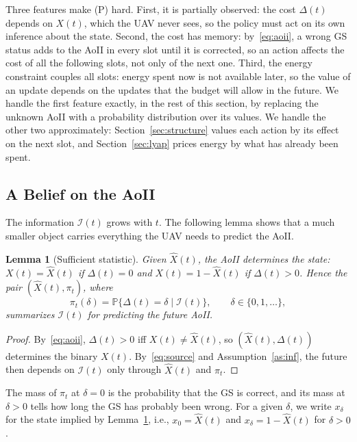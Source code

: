 \documentclass[journal]{IEEEtran}
\newtheorem{lemma}{Lemma}
\theoremstyle{remark}
\newcommand{\Prob}{\mathbb{P}}
\newcommand{\I}{\mathcal{I}}
\begin{document}
Three features make (P) hard. First, it is partially observed: the cost $\Delta(t)$ depends on $X(t)$, which the UAV never sees, so the policy must act on its own inference about the state. Second, the cost has memory: by~\eqref{eq:aoii}, a wrong GS status adds to the AoII in every slot until it is corrected, so an action affects the cost of all the following slots, not only of the next one. Third, the energy constraint couples all slots: energy spent now is not available later, so the value of an update depends on the updates that the budget will allow in the future. We handle the first feature exactly, in the rest of this section, by replacing the unknown AoII with a probability distribution over its values. We handle the other two approximately: Section~\ref{sec:structure} values each action by its effect on the next slot, and Section~\ref{sec:lyap} prices energy by what has already been spent.

\subsection{A Belief on the AoII}\label{sec:belief}
The information $\I(t)$ grows with $t$. The following lemma shows that a much smaller object carries everything the UAV needs to predict the AoII.

\begin{lemma}[Sufficient statistic]\label{lem:suff}
Given $\hat X(t)$, the AoII determines the state: $X(t)=\hat X(t)$ if $\Delta(t)=0$ and $X(t)=1-\hat X(t)$ if $\Delta(t)>0$. Hence the pair $(\hat X(t),\pi_t)$, where
\begin{equation}\label{eq:belief}
\pi_t(\delta)=\Prob\big\{\Delta(t)=\delta\mid\I(t)\big\},\qquad\delta\in\{0,1,\dots\},
\end{equation}
summarizes $\I(t)$ for predicting the future AoII.
\end{lemma}
\begin{proof}
By~\eqref{eq:aoii}, $\Delta(t)>0$ iff $X(t)\neq\hat X(t)$, so $(\hat X(t),\Delta(t))$ determines the binary $X(t)$. By~\eqref{eq:source} and Assumption~\ref{as:inf}, the future then depends on $\I(t)$ only through $\hat X(t)$ and $\pi_t$.
\end{proof}

The mass of $\pi_t$ at $\delta=0$ is the probability that the GS is correct, and its mass at $\delta>0$ tells how long the GS has probably been wrong. For a given $\delta$, we write $x_\delta$ for the state implied by Lemma~\ref{lem:suff}, i.e., $x_0=\hat X(t)$ and $x_\delta=1-\hat X(t)$ for $\delta>0$.
\end{document}
